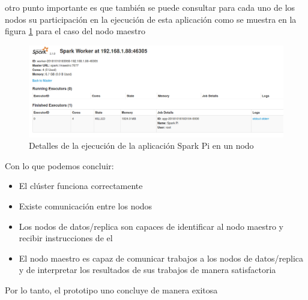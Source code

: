 otro punto importante es que también se puede consultar para cada uno de los nodos su participación en la ejecución de esta aplicación como se muestra en la figura \ref{fig:red8} para el caso del nodo maestro
\newpage
\begin{figure}[!htbp]
	\hypertarget{fig:red8}{\hspace{1pt}}
	\begin{center}
		\includegraphics[width=.7\textwidth]{capitulo3/images/im11.png}
		\caption{Detalles de la ejecución de la aplicación Spark Pi en un nodo}
		\label{fig:red8}
	\end{center}
\end{figure}

Con lo que podemos concluir:
\begin{itemize}
	\item El clúster funciona correctamente
	\item Existe comunicación entre los nodos
	\item Los nodos de datos/replica son capaces de identificar al nodo maestro y recibir instrucciones de el
	\item El nodo maestro es capaz de comunicar trabajos a los nodos de datos/replica y de interpretar los resultados de sus trabajos de manera satisfactoria
\end{itemize}
Por lo tanto, el prototipo uno concluye de manera exitosa

